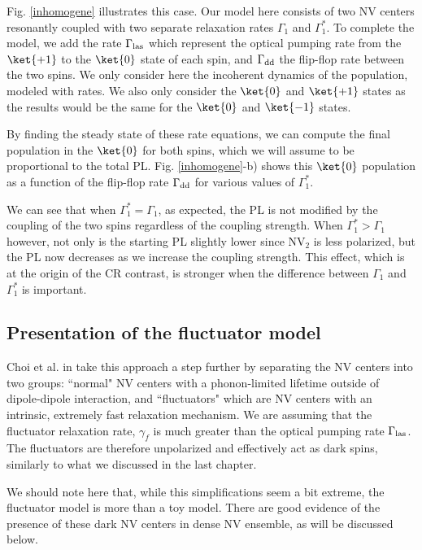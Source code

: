 \documentclass[a4paper,11pt]{report}
\begin{document}
Fig. \ref{inhomogene} illustrates this case. Our model here consists of two NV centers resonantly coupled with two separate relaxation rates $\Gamma_1$ and $\Gamma_1^*$. To complete the model, we add the rate $\Gamma_{\rm las}$ which represent the optical pumping rate from the $\ket{+1}$ to the $\ket{0}$ state of each spin, and $\Gamma_{\rm dd}$ the flip-flop rate between the two spins. We only consider here the incoherent dynamics of the population, modeled with rates. We also only consider the $\ket{0}$ and $\ket{+1}$ states as the results would be the same for the $\ket{0}$ and $\ket{-1}$ states. 

By finding the steady state of these rate equations, we can compute the final population in the $\ket{0}$ for both spins, which we will assume to be proportional to the total PL. Fig. \ref{inhomogene}-b) shows this $\ket{0}$ population as a function of the flip-flop rate $\Gamma_{\rm dd}$ for various values of $\Gamma_1^*$.

We can see that when $\Gamma_1^*=\Gamma_1$, as expected, the PL is not modified by the coupling of the two spins regardless of the coupling strength. When $\Gamma_1^*>\Gamma_1$ however, not only is the starting PL slightly lower since NV$_2$ is less polarized, but the PL now decreases as we increase the coupling strength. This effect, which is at the origin of the CR contrast, is stronger when the difference between $\Gamma_1$ and $\Gamma_1^*$ is important.

\subsection{Presentation of the fluctuator model}
Choi et al. in \citep{choi2017depolarization} take this approach a step further by separating the NV centers into two groups: ``normal" NV centers with a phonon-limited lifetime outside of dipole-dipole interaction, and ``fluctuators" which are NV centers with an intrinsic, extremely fast relaxation mechanism. We are assuming that the fluctuator relaxation rate, $\gamma_f$ is much greater than the optical pumping rate $\Gamma_{\rm las}$. The fluctuators are therefore unpolarized and effectively act as dark spins, similarly to what we discussed in the last chapter.

We should note here that, while this simplifications seem a bit extreme, the fluctuator model is more than a toy model. There are good evidence of the presence of these dark NV centers in dense NV ensemble, as will be discussed below.
\end{document}
